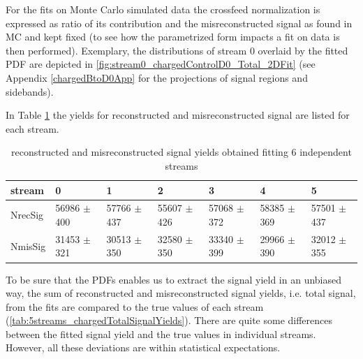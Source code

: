 For the fits on Monte Carlo simulated data the crossfeed normalization is expressed as ratio of its contribution  and the misreconstructed signal as found in MC and kept fixed (to see how the parametrized form impacts a fit on data is then performed).
Exemplary, the distributions of stream 0 overlaid by the fitted PDF are depicted in \cref{fig:stream0_chargedControlD0_Total_2DFit} (see Appendix \ref{chargedBtoD0App} for the projections of signal regions and sidebands). 

In Table \ref{tab:5streams_chargedSignalYields} the yields for reconstructed and misreconstructed signal are listed for each stream.\\
\begin{table}[H]
\centering
\begin{tabular}{ |p{1.5cm}||p{2.2cm}| p{2.2cm}| p{2.2cm}| p{2.2cm}| p{2.2cm}| p{2.2cm}|  }
 \hline
  stream   &  0  & 1 & 2 & 3 & 4 & 5 \\
 \hline
 NrecSig  &  56986 $\pm$ 400  & 57766 $\pm$ 437  & 55607 $\pm$ 426 & 57068 $\pm$ 372 & 58385 $\pm$ 369 & 57501 $\pm$ 437 \\
 NmisSig &  31453 $\pm$ 321 & 30513 $\pm$ 350 & 32580  $\pm$ 350 & 33340 $\pm$  399 & 29966  $\pm$ 390 & 32012 $\pm$ 355\\
 \hline
 \end{tabular}%
 \caption{reconstructed and misreconstructed signal yields obtained fitting 6 independent streams}\label{tab:5streams_chargedSignalYields}
\end{table}

To be sure that the PDFs enables us to extract the signal yield in an unbiased way, the sum of reconstructed and misreconstructed signal yields, i.e. total signal, from the fits are compared to the true values of each stream (\cref{tab:5streams_chargedTotalSignalYields}).
There are quite some differences between the fitted signal yield and the true values in individual streams. However,  all these deviations are within statistical expectations. \\

